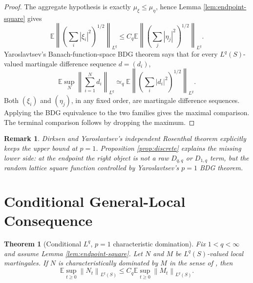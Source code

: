 \documentclass[11pt]{article}
\newtheorem{theorem}{Theorem}
\newtheorem{remark}{Remark}
\newcommand{\E}{\mathbb E}
\newcommand{\norm}[1]{\left\lVert #1\right\rVert}
\newcommand{\simeqq}{\simeq_q}
\begin{document}
\begin{proof}
The aggregate hypothesis is exactly \(\mu_\xi\le\mu_\eta\), hence Lemma
\ref{lem:endpoint-square} gives
\[
  \E\left\|\left(\sum_i|\xi_i|^2\right)^{1/2}\right\|_{L^q}
  \le
  C_q
  \E\left\|\left(\sum_j|\eta_j|^2\right)^{1/2}\right\|_{L^q}.
\]
Yaroslavtsev's Banach-function-space BDG theorem
\cite[Theorem 4.32 and Proposition 4.33]{Yaroslavtsev2018} says that for every
\(L^q(S)\)-valued martingale difference sequence \(d=(d_i)\),
\[
  \E\sup_N\left\|\sum_{i=1}^N d_i\right\|_{L^q}
  \simeqq
  \E\left\|
      \left(\sum_i |d_i|^2\right)^{1/2}
    \right\|_{L^q}.
\]
Both \((\xi_i)\) and \((\eta_j)\), in any fixed order, are martingale
difference sequences.  Applying the BDG equivalence to the two families gives
the maximal comparison.  The terminal comparison follows by dropping the
maximum.
\end{proof}

\begin{remark}
Dirksen and Yaroslavtsev's independent Rosenthal theorem
\cite[Theorem 2.1]{DirksenYaroslavtsev2017} explicitly keeps the upper bound
at \(p=1\).  Proposition \ref{prop:discrete} explains the missing lower side:
at the endpoint the right object is not a raw \(D_{q,q}\) or \(D_{1,q}\) term,
but the random lattice square function controlled by
Yaroslavtsev's \(p=1\) BDG theorem.
\end{remark}

\section*{Conditional General-Local Consequence}

\begin{theorem}[Conditional \(L^q\), \(p=1\) characteristic domination]
\label{thm:conditional-main}
Fix \(1<q<\infty\) and assume Lemma \ref{lem:endpoint-square}.  Let \(N\) and
\(M\) be \(L^q(S)\)-valued local martingales.  If \(N\) is characteristically
dominated by \(M\) in the sense of \cite[Definition 12.9]{Yaroslavtsev2019},
then
\[
  \E\sup_{t\ge0}\norm{N_t}_{L^q(S)}
  \le
  C_q
  \E\sup_{t\ge0}\norm{M_t}_{L^q(S)}.
\]
\end{theorem}
\end{document}
